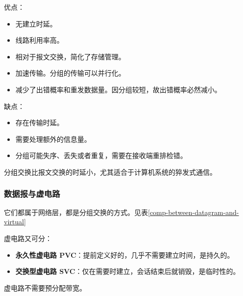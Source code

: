 \documentclass[12pt, a4paper, oneside]{ctexart}
\begin{document}
\begin{enumerate}
    优点：
    \begin{itemize}
        \item 无建立时延。
        \item 线路利用率高。
        \item 相对于报文交换，简化了存储管理。
        \item 加速传输。分组的传输可以并行化。
        \item 减少了出错概率和重发数据量。因分组较短，故出错概率必然减小。
    \end{itemize}
    缺点：
    \begin{itemize}
        \item 存在传输时延。
        \item 需要处理额外的信息量。
        \item 分组可能失序、丢失或者重复，需要在接收端重排检错。
    \end{itemize}
    分组交换比报文交换的时延小，尤其适合于计算机系统的猝发式通信。
\end{enumerate}

\subsubsection{数据报与虚电路}

它们都属于网络层，都是分组交换的方式。见表\ref{comp-between-datagram-and-virtual}

虚电路又可分：
\begin{itemize}
    \item {\bf 永久性虚电路 PVC}：提前定义好的，几乎不需要建立时间，是持久的。
    \item {\bf 交换型虚电路 SVC}：仅在需要时建立，会话结束后就销毁，是临时性的。
\end{itemize}

虚电路不需要预分配带宽。
\end{document}

